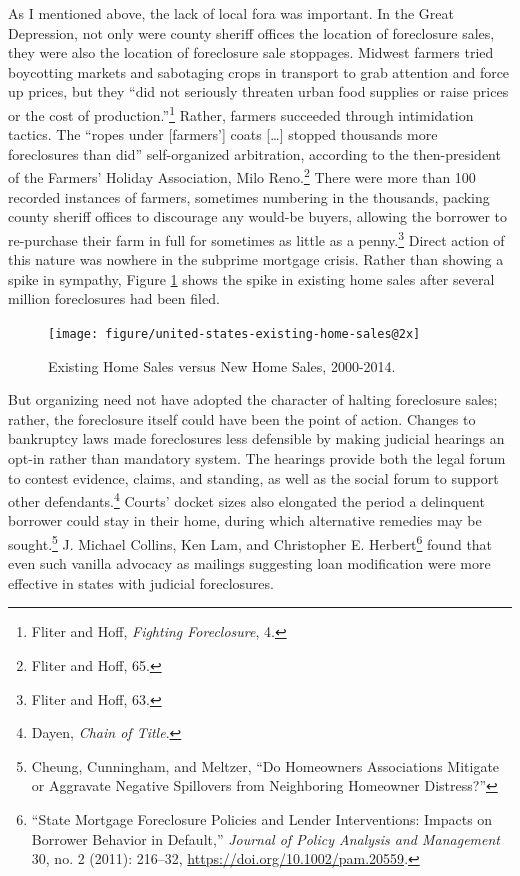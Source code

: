 \documentclass[12pt,oneside]{psthesis}
\begin{document}
As I mentioned above, the lack of local fora was important.
In the Great Depression, not only were county sheriff offices the location of foreclosure sales, they were also the location of foreclosure sale stoppages.
Midwest farmers tried boycotting markets and sabotaging crops in transport to grab attention and force up prices, but they ``did not seriously threaten urban food supplies or raise prices or the cost of production.''\footnote{Fliter and Hoff, \emph{Fighting Foreclosure}, 4.}
Rather, farmers succeeded through intimidation tactics.
The ``ropes under {[}farmers'{]} coats {[}\ldots{]} stopped thousands more foreclosures than did'' self-organized arbitration, according to the then-president of the Farmers' Holiday Association, Milo Reno.\footnote{Fliter and Hoff, 65.}
There were more than 100 recorded instances of farmers, sometimes numbering in the thousands, packing county sheriff offices to discourage any would-be buyers, allowing the borrower to re-purchase their farm in full for sometimes as little as a penny.\footnote{Fliter and Hoff, 63.}
Direct action of this nature was nowhere in the subprime mortgage crisis.
Rather than showing a spike in sympathy, Figure \ref{fig:tradingecon} shows the spike in existing home sales after several million foreclosures had been filed.
\begin{figure}

{\centering \texttt{[image: figure/united-states-existing-home-sales@2x]} 

}

\caption{Existing Home Sales versus New Home Sales, 2000-2014.}\label{fig:tradingecon}
\end{figure}
But organizing need not have adopted the character of halting foreclosure sales; rather, the foreclosure itself could have been the point of action.
Changes to bankruptcy laws made foreclosures less defensible by making judicial hearings an opt-in rather than mandatory system.
The hearings provide both the legal forum to contest evidence, claims, and standing, as well as the social forum to support other defendants.\footnote{Dayen, \emph{Chain of Title}.}
Courts' docket sizes also elongated the period a delinquent borrower could stay in their home, during which alternative remedies may be sought.\footnote{Cheung, Cunningham, and Meltzer, ``Do Homeowners Associations Mitigate or Aggravate Negative Spillovers from Neighboring Homeowner Distress?''}
J. Michael Collins, Ken Lam, and Christopher E. Herbert\footnote{``State Mortgage Foreclosure Policies and Lender Interventions: Impacts on Borrower Behavior in Default,'' \emph{Journal of Policy Analysis and Management} 30, no. 2 (2011): 216--32, \url{https://doi.org/10.1002/pam.20559}.} found that even such vanilla advocacy as mailings suggesting loan modification were more effective in states with judicial foreclosures.
\end{document}
